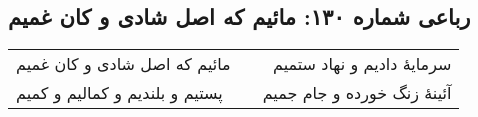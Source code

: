 \begin{center}
\section*{رباعی شماره ۱۳۰: مائیم که اصل شادی و کان غمیم}
\label{sec:sh130}
\begin{longtable}{l p{0.5cm} r}
مائیم که اصل شادی و کان غمیم
&&
سرمایهٔ دادیم و نهاد ستمیم
\\
پستیم و بلندیم و کمالیم و کمیم
&&
آئینهٔ زنگ خورده و جام جمیم
\\
\end{longtable}
\end{center}
